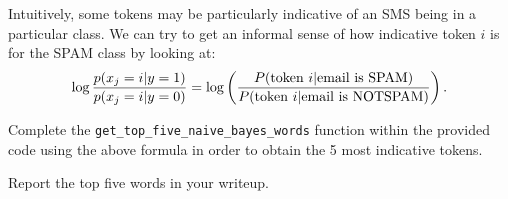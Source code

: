 \item {}
Intuitively, some tokens may be particularly indicative of an SMS being
in a particular class.  We can try to get an informal sense of how indicative
token $i$ is for the SPAM class by looking at:
\begin{equation*}
  \log \frac{p(x_j = i| y=1)}{p(x_j = i|y=0)}
  = \log\left(\frac{P(\hbox{token $i$} | \hbox{email is SPAM})}
    {P(\hbox{token $i$} | \hbox{email is NOTSPAM})}\right).
\end{equation*}

Complete the \texttt{get\_top\_five\_naive\_bayes\_words} function within the provided code using the above formula in order to obtain the 5 most indicative tokens.

Report the top five words in your writeup.

